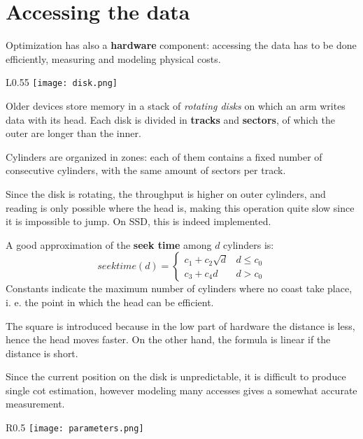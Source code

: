 \section{Accessing the data}
Optimization has also a \textbf{hardware} component: accessing the data has to be done efficiently, measuring and modeling physical costs. 

\begin{wrapfigure}{L}{0.55\textwidth}
	\vspace{-15pt}
	\texttt{[image: disk.png]}
	\vspace{-25pt}
\end{wrapfigure}

Older devices store memory in a stack of \textit{rotating disks} on which an arm writes data with its head. Each disk is divided in \textbf{tracks} and \textbf{sectors}, of which the outer are longer than the inner.

Cylinders are organized in zones: each of them contains a fixed number of consecutive cylinders, with the same amount of sectors per track. 

Since the disk is rotating, the throughput is higher on outer cylinders, and reading is only possible where the head is, making this operation quite slow since it is impossible to jump. On SSD, this is indeed implemented.

A good approximation of the \textbf{seek time} among $d$ cylinders is:
$$seektime(d) = \begin{cases}
	c_1 + c_2\sqrt{d} & d \leq c_0 \\
	c_3 + c_4d & d> c_0
\end{cases}$$
Constants indicate the maximum number of cylinders where no coast take place, i. e. the point in which the head can be efficient. 

The square is introduced because in the low part of hardware the distance is less, hence the head moves faster. On the other hand, the formula is linear if the distance is short.

Since the current position on the disk is unpredictable, it is difficult to produce single cot estimation, however modeling many accesses gives a somewhat accurate measurement. 

\begin{wrapfigure}{R}{0.5\textwidth}
	\vspace{-15pt}
	\texttt{[image: parameters.png]}
	\vspace{-30pt}
\end{wrapfigure}

